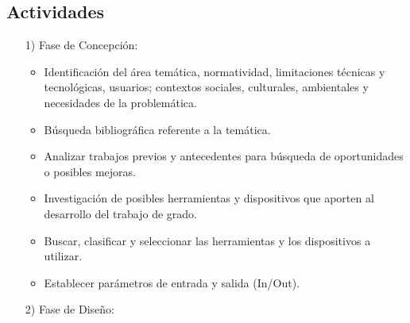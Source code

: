 \subsection{Actividades} \label{actividades}
\begin{itemize}
\item[1)] Fase de Concepción:
	\begin{itemize}
	
	\item Identificaci\'on del área temática, normatividad, limitaciones técnicas y tecnológicas, usuarios; contextos sociales, culturales, ambientales y necesidades de la problem\'atica.
	\item Búsqueda bibliogr\'afica referente a la tem\'atica.
	\item Analizar trabajos previos y antecedentes para búsqueda de oportunidades o posibles mejoras.
	\item Investigaci\'on de posibles herramientas y dispositivos que aporten al desarrollo del trabajo de grado.
	\item Buscar, clasificar y seleccionar las herramientas y los dispositivos a utilizar.
	\item Establecer parámetros de entrada y salida (In/Out).

	\end{itemize}
	
\item[2)] Fase de Dise\~no:
	\begin{itemize}


\end{itemize}
\end{itemize}
